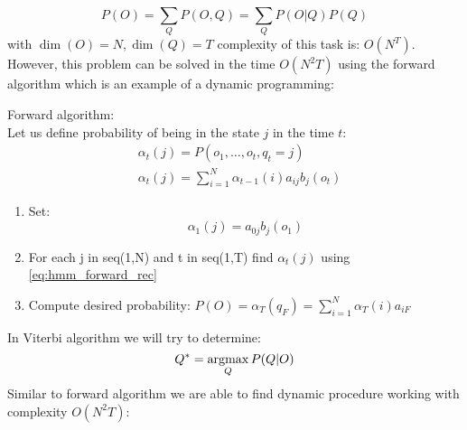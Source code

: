 \begin{equation}
	P(O)=\sum\limits_Q P(O,Q) = \sum\limits_Q P(O|Q)P(Q)
\end{equation}
with $\dim(O)=N, \dim(Q)=T$ complexity of this task is: $O(N^T)$. However, this problem can be solved in the time $O(N^2 T)$ using the forward algorithm which is an example of a dynamic programming:


\begin{algorithm} Forward algorithm: \\
	\label{arg:forward}
	Let us define probability of being in the state $j$ in the time $t$:
	\begin{align}
		&\alpha_t(j)=P(o_1,\ldots,o_t,q_t=j) \\
		\label{eq:hmm_forward_rec}
		&\alpha_t(j)=\sum\limits_{i=1}^{N} \alpha_{t-1}(i)a_{ij}b_j(o_t)
	\end{align}

	\begin{enumerate}
		\item Set:
			\begin{equation}
				\alpha_1(j)= a_{0j}b_j(o_1)
			\end{equation}
		\item For each j in seq(1,N) and t in seq(1,T) find $\alpha_t(j)$ using \eqref{eq:hmm_forward_rec} 
		\item Compute desired probability: $P(O) = \alpha_{T}(q_F)=\sum\limits^{N}_{i=1}\alpha_T(i)a_{iF}$

	\end{enumerate}
\end{algorithm}

In Viterbi algorithm we will try to determine:
\begin{equation}
	Q^*=\operatorname*{argmax}\limits_{Q} P(Q|O)
\end{equation}
Similar to forward algorithm we are able to find dynamic procedure working with complexity $O(N^2 T)$:

